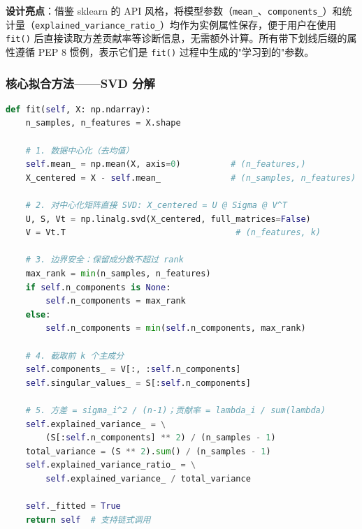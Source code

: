 \documentclass[a4paper]{article}
\begin{document}
\textbf{设计亮点}：借鉴 sklearn 的 API 风格，将模型参数（\texttt{mean\_}、\texttt{components\_}）和统计量（\texttt{explained\_\allowbreak{}variance\_\allowbreak{}ratio\_}）均作为实例属性保存，便于用户在使用 \texttt{fit()} 后直接读取方差贡献率等诊断信息，无需额外计算。所有带下划线后缀的属性遵循 PEP 8 惯例，表示它们是 \texttt{fit()} 过程中生成的"学习到的"参数。

\subsubsection{核心拟合方法——SVD 分解}

\begin{lstlisting}[language=Python, caption=PCA.fit()——SVD分解核心逻辑]
def fit(self, X: np.ndarray):
    n_samples, n_features = X.shape

    # 1. 数据中心化（去均值）
    self.mean_ = np.mean(X, axis=0)          # (n_features,)
    X_centered = X - self.mean_              # (n_samples, n_features)

    # 2. 对中心化矩阵直接 SVD: X_centered = U @ Sigma @ V^T
    U, S, Vt = np.linalg.svd(X_centered, full_matrices=False)
    V = Vt.T                                  # (n_features, k)

    # 3. 边界安全：保留成分数不超过 rank
    max_rank = min(n_samples, n_features)
    if self.n_components is None:
        self.n_components = max_rank
    else:
        self.n_components = min(self.n_components, max_rank)

    # 4. 截取前 k 个主成分
    self.components_ = V[:, :self.n_components]
    self.singular_values_ = S[:self.n_components]

    # 5. 方差 = sigma_i^2 / (n-1)；贡献率 = lambda_i / sum(lambda)
    self.explained_variance_ = \
        (S[:self.n_components] ** 2) / (n_samples - 1)
    total_variance = (S ** 2).sum() / (n_samples - 1)
    self.explained_variance_ratio_ = \
        self.explained_variance_ / total_variance

    self._fitted = True
    return self  # 支持链式调用
\end{lstlisting}
\end{document}
